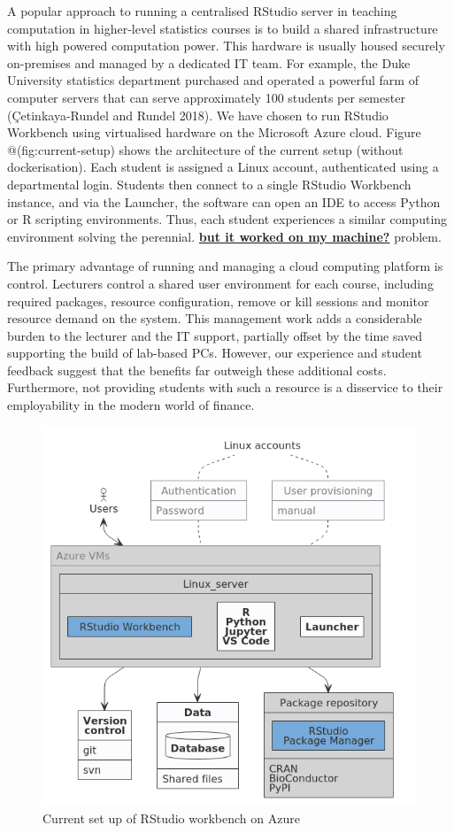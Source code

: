 \documentclass{article}
\begin{document}
A popular approach to running a centralised RStudio server in teaching
computation in higher-level statistics courses is to build a shared
infrastructure with high powered computation power. This hardware is
usually housed securely on-premises and managed by a dedicated IT team.
For example, the Duke University statistics department purchased and
operated a powerful farm of computer servers that can serve
approximately 100 students per semester (Çetinkaya-Rundel and Rundel
2018). We have chosen to run RStudio Workbench using virtualised
hardware on the Microsoft Azure cloud. Figure @(fig:current-setup) shows
the architecture of the current setup (without dockerisation). Each
student is assigned a Linux account, authenticated using a departmental
login. Students then connect to a single RStudio Workbench instance, and
via the Launcher, the software can open an IDE to access Python or R
scripting environments. Thus, each student experiences a similar
computing environment solving the perennial.
\href{https://www.kevinwanke.com/why-you-should-never-use-the-phrase-but-it-works-on-my-machine/}{\textbf{but
it worked on my machine?}} problem.

The primary advantage of running and managing a cloud computing platform
is control. Lecturers control a shared user environment for each course,
including required packages, resource configuration, remove or kill
sessions and monitor resource demand on the system. This management work
adds a considerable burden to the lecturer and the IT support, partially
offset by the time saved supporting the build of lab-based PCs. However,
our experience and student feedback suggest that the benefits far
outweigh these additional costs. Furthermore, not providing students
with such a resource is a disservice to their employability in the
modern world of finance.

\begin{figure}

{\centering \includegraphics[width=0.7\linewidth]{img/rstudiowb} 

}

\caption{Current set up of RStudio workbench on Azure}\label{fig:current-setup}
\end{figure}
\end{document}
